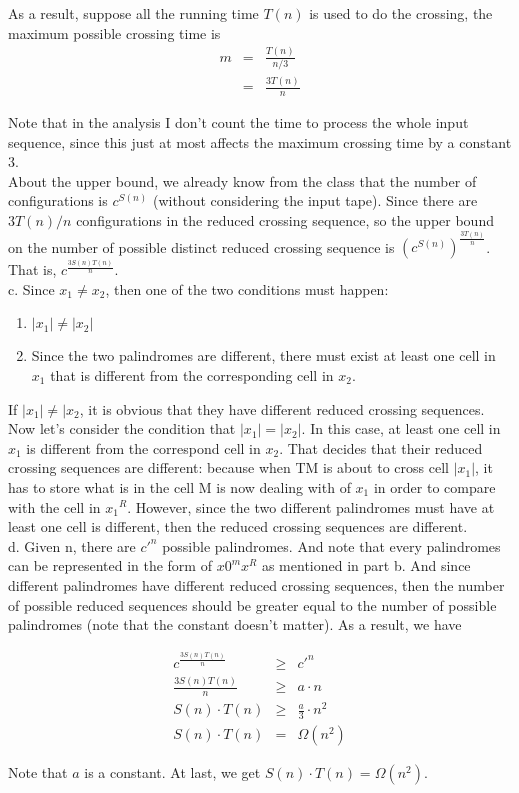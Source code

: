 \documentclass[12pt]{article}
\begin{document}
As a result, suppose all the running time $T(n)$ is used to do the
crossing, the maximum possible crossing time is
\begin{eqnarray*}
  m & = & \frac {T(n)}{n/3} \\
    & = & \frac {3T(n)}{n}
\end{eqnarray*}

Note that in the analysis I don't count the time to process the whole
input sequence, since this just at most affects the maximum crossing
time by a constant 3. \\

About the upper bound, we already know from the class that the number
of configurations is $c^{S(n)}$ (without considering the input
tape). Since there are ${3T(n)}/n$ configurations in the reduced
crossing sequence, so the upper bound on the number of possible
distinct reduced crossing sequence is $(c^{S(n)})^{\frac {3T(n)}{n}}$.
That is, $c^{\frac {3S(n)T(n)}{n}}$.\\

c. Since $x_1 \neq x_2$, then one of the two conditions must happen:

\begin{enumerate}
\item $|x_1| \neq |x_2|$
\item Since the two palindromes are different, there must exist at
  least one cell in $x_1$ that is different from the corresponding
  cell in $x_2$.
\end{enumerate}

If $|x_1| \neq |x_2$, it is obvious that they have different reduced
crossing sequences. Now let's consider the condition that $|x_1| =
|x_2|$. In this case, at least one cell in $x_1$ is different from the
correspond cell in $x_2$. That decides that their reduced crossing
sequences are different: because when TM is about to cross cell $|x_1|$,
it has to store what is in the cell M is now dealing with of $x_1$ in
order to compare with the cell in ${x_1}^R$. However, since the two
different palindromes must have at least one cell is different, then
the reduced crossing sequences are different.\\

d. Given n, there are ${c'}^n$ possible palindromes. And note that
every palindromes can be represented in the form of $x0^mx^R$ as
mentioned in part b. And since different palindromes have different
reduced crossing sequences, then the number of possible reduced
sequences should be greater equal to the number of possible
palindromes (note that the constant doesn't matter).  As a result, we
have 

\begin{eqnarray*}
c^{\frac {3S(n)T(n)}{n}} & \geq & {c'}^{n} \\
\frac {3S(n)T(n)}{n} & \geq & a \cdot n \\
S(n) \cdot T(n) & \geq & \frac {a}{3} \cdot n^2 \\
S(n) \cdot T(n) & = & \Omega (n^2)
\end{eqnarray*}

Note that $a$ is a constant. At last, we get $S(n) \cdot T(n) = \Omega
(n^2)$.
\end{document}
